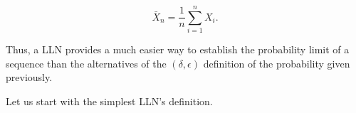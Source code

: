 \documentclass[english,12pt]{book}\usepackage[]{graphicx}\usepackage[]{xcolor}
\begin{document}
\begin{equation*}
\bar{X}_n = \frac{1}{n}\sum_{i = 1}^n X_i.
\end{equation*}

Thus, a LLN provides a much easier way to establish the probability limit of a sequence than the alternatives of the $(\delta, \epsilon)$ definition of the probability given previously. 






Let us start with the simplest LLN's definition. 
\end{document}

